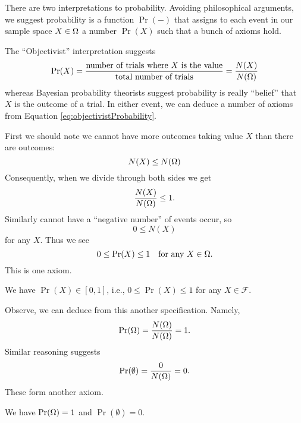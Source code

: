 \M
There are two interpretations to probability. Avoiding philosophical
arguments, we suggest probability is a function $\Pr(-)$ that assigns to each
event in our sample space $X\in\Omega$ a number $\Pr(X)$ such that
a bunch of axioms hold.

\begin{rmk}
The ``Objectivist'' interpretation suggests
\begin{equation}\label{eq:objectivistProbability}
\mathop{\mathrm{Pr}}\nolimits(X) = \frac{\mbox{number of trials where $X$ is the
    value}}{\mbox{total number of trials}} = \frac{N(X)}{N(\Omega)}
\end{equation}
whereas Bayesian probability theorists suggest probability is really
``belief'' that $X$ is the outcome of a trial. In either event, we can
deduce a number of axioms from Equation
\eqref{eq:objectivistProbability}.
\end{rmk}

First we should note we cannot have more outcomes taking value $X$ than
there are outcomes:
\begin{equation}
N(X)\leq N(\Omega)
\end{equation}
Consequently, when we divide through both sides we get
\begin{equation}
\frac{N(X)}{N(\Omega)}\leq 1.
\end{equation}
Similarly cannot have a ``negative number'' of events occur, so
\begin{equation}
0\leq N(X)
\end{equation}
for any $X$. Thus we see
\begin{equation}
0\leq\mathop{\mathrm{Pr}}\nolimits(X)\leq 1\quad\mbox{for any }X\in\Omega.
\end{equation}
This is one axiom.

\begin{axiom}
We have $\Pr(X)\in[0,1]$, i.e., $0\leq\Pr(X)\leq1$ for any
$X\in\mathcal{F}$. 
\end{axiom}

Observe, we can deduce from this another specification. Namely,
\begin{equation}
\mathop{\mathrm{Pr}}\nolimits(\Omega)=\frac{N(\Omega)}{N(\Omega)}=1.
\end{equation}
Similar reasoning suggests
\begin{equation}
\mathop{\mathrm{Pr}}\nolimits(\emptyset)=\frac{0}{N(\Omega)}=0.
\end{equation}
These form another axiom.

\begin{axiom}
We have $\mathop{\mathrm{Pr}}\nolimits(\Omega)=1$ and $\Pr(\emptyset)=0$.
\end{axiom}

